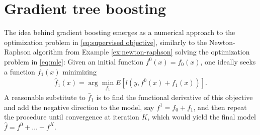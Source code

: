 





\section{Gradient tree boosting}
\label{sec:gradient tree boosting}
The idea behind gradient boosting emerges as a numerical approach to the optimization problem in \eqref{eq:supervised objective}, similarly to the Newton-Raphson algorithm from Example \ref{ex:newton-raphson} solving the optimization problem in \eqref{eq:mle}:
Given an initial function $f^0(x)=f_0(x)$, one ideally seeks a function $f_1(x)$ minimizing
\begin{align}
	\hat{f}_1(x) = \arg\min_{f_1} E\left[ l\left(y,f^0(x)+f_1(x)\right) \right].
\end{align}
A reasonable substitute to $\hat{f}_1$ is to find the functional derivative of this objective and add the negative direction to the model, say $f^1 = f_0 + f_1$, and then repeat the procedure until convergence at iteration $K$, which would yield the final model $\hat{f}=f^0+\dots+f^K$.

